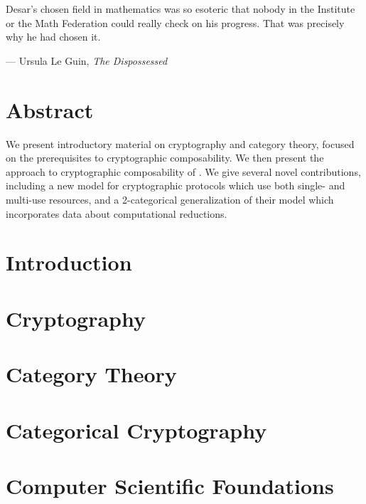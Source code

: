 \documentclass[12pt,twoside]{diff-reedthesis}
\begin{document}


\tableofcontents

\chapter*{}
\begin{dedication}
  Desar's chosen field in mathematics was so esoteric that nobody in the
  Institute or the Math Federation could really check on his progress. That was
  precisely why he had chosen it.

  --- Ursula Le Guin, \emph{The Dispossessed}
\end{dedication}


\chapter*{Abstract}
We present introductory material on cryptography and category theory, focused on
the prerequisites to cryptographic composability. We then present the approach
to cryptographic composability of \citeauthor{broadbent-karvonen-2022}. We give
several novel contributions, including a new model for cryptographic protocols
which use both single- and multi-use resources, and a 2-categorical
generalization of their model which incorporates data about computational
reductions.

\mainmatter%
\pagestyle{fancyplain} %

\chapter*{Introduction}


\chapter{Cryptography}


\chapter{Category Theory}


\chapter{Categorical Cryptography}


\appendix
\chapter{Computer Scientific Foundations}


\backmatter{}
\nocite{*}
\printbibliography


\end{document}
